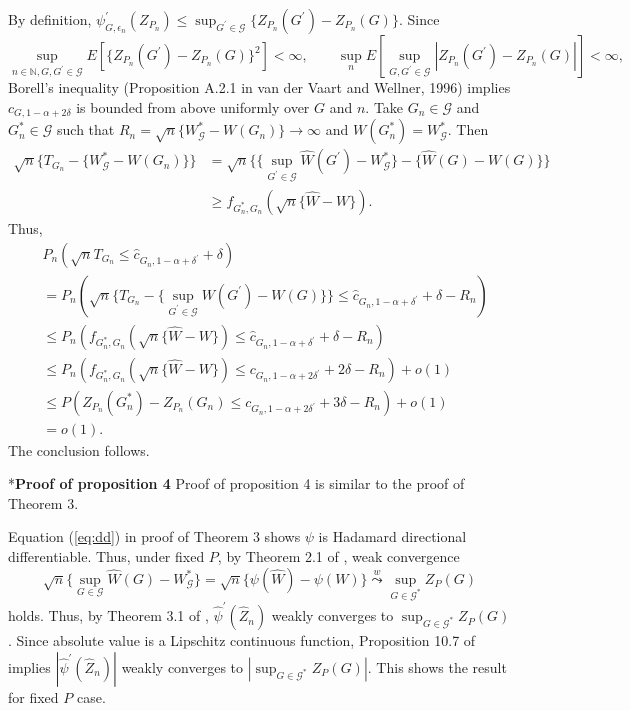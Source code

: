 \documentclass[12pt,oneside,reqno,english]{amsart}
\makeatletter
\renewcommand\subsection{\@startsection{subsection}{2}%
  \z@{-.5\linespacing\@plus-.7\linespacing}{.5\linespacing}%
  {\normalfont\scshape}}
\theoremstyle{definition}
\makeatother
\begin{document}
By definition, $\psi^{\prime}_{G,\epsilon_{n}}(Z_{P_{n}})\leq \sup_{G^{\prime}\in \mathcal{G}}\{Z_{P_{n}}(G^{\prime})-Z_{P_{n}}(G)\}$. 
Since 
\[\sup_{n\in \mathbb{N}, G,G^{\prime}\in \mathcal{G}}E[\{Z_{P_{n}}(G^{\prime})-Z_{P_{n}}(G)\}^{2}]<\infty,\qquad \sup_{n}E[\sup_{G,G^{\prime}\in \mathcal{G}}|Z_{P_{n}}(G^{\prime})-Z_{P_{n}}(G)|]<\infty,\]
 Borell's inequality (Proposition A.2.1 in van der Vaart and Wellner, 1996) 
 implies $c_{G,1-\alpha+2\delta}$ is bounded from above uniformly over $G$ and $n$.
Take $G_{n}\in \mathcal{G}$ and $G^{*}_{n}\in \mathcal{G}$ such that 
$R_{n}=\sqrt{n}\{W^{*}_{\mathcal{G}}-W(G_{n})\}\rightarrow \infty$ and $W(G^{*}_{n})= W^{*}_{\mathcal{G}}$.
Then  
\begin{align*}
\sqrt{n}\{T_{G_{n}}-\{W^{*}_{\mathcal{G}}-W(G_{n})\}\}&=
\sqrt{n}\{\{\sup_{G^{\prime}\in \mathcal{G}}\hat{W}(G^{\prime})-W^{*}_{\mathcal{G}}\}-\{\hat{W}(G)-W(G)\}\}\\
&\geq f_{G^{*}_{n},G_{n}}(\sqrt{n}\{\hat{W}-W\}).
\end{align*}
Thus, 
\begin{align*}
&P_{n}(\sqrt{n}T_{G_{n}}\leq \hat{c}_{G_{n},1-\alpha+\delta^{\prime}}+\delta)\\
&=P_{n}(\sqrt{n}\{T_{G_{n}}-\{\sup_{G^{\prime}\in \mathcal{G}}W(G^{\prime})-W(G)\}\}\leq \hat{c}_{G_{n},1-\alpha+\delta^{\prime}}+\delta-R_{n})\\
&\leq P_{n}(f_{G^{*}_{n},G_{n}}(\sqrt{n}\{\hat{W}-W\}) \leq \hat{c}_{G_{n},1-\alpha+\delta^{\prime}}+\delta-R_{n})\\
&\leq P_{n}(f_{G^{*}_{n},G_{n}}(\sqrt{n}\{\hat{W}-W\}) \leq c_{G_{n},1-\alpha+2\delta^{\prime}}+2\delta-R_{n})+o(1)\\
&\leq P(Z_{P_{n}}(G^{*}_{n})-Z_{P_{n}}(G_{n})\leq c_{G_{n},1-\alpha+2\delta^{\prime}}+3\delta-R_{n})+o(1)\\
&= o(1).
\end{align*}
The conclusion follows. 

\subsection*{\bf{Proof of proposition 4}}
Proof of proposition 4 is similar to the proof of Theorem 3. 

Equation (\ref{eq:dd}) in proof of Theorem 3 shows $\psi$ is Hadamard directional differentiable. 
Thus, under fixed $P$, by Theorem 2.1 of \cite{FS:16}, weak convergence  
\[\sqrt{n}\{\sup_{G\in \mathcal{G}}\hat{W}(G)-W^{*}_{\mathcal{G}}\}=\sqrt{n}\{\psi(\hat{W})-\psi(W)\} \overset{w}{\underset{}{\leadsto}}\sup_{G\in \mathcal{G}^{*}}Z_{P}(G)\] 
holds. Thus, by Theorem 3.1 of \cite{HL:18}, $\hat{\psi}^{\prime}(\hat{Z}_{n})$ weakly converges to 
$\sup_{G\in \mathcal{G}^{*}}Z_{P}(G)$. Since absolute value is a Lipschitz continuous function, Proposition 10.7 of 
\cite{Kosorok:07} implies $|\hat{\psi}^{\prime}(\hat{Z}_{n})|$ weakly converges to $|\sup_{G\in \mathcal{G}^{*}}Z_{P}(G)|$. This shows the result for fixed $P$ case. 
\end{document}
